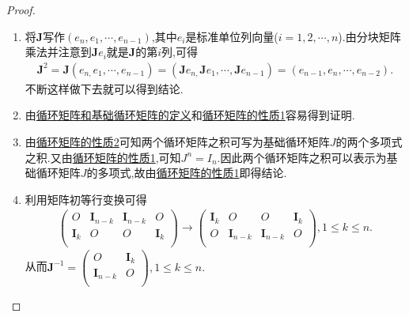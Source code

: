 \documentclass[../../main.tex]{subfiles}
\begin{document}
\begin{proof}
\begin{enumerate}
\item 将$\boldsymbol{J}$写作$(e_n,e_1,\cdots,e_{n-1})$,其中$e_i$是标准单位列向量($i=1,2,\cdots,n$).由分块矩阵乘法并注意到$\boldsymbol{J}e_i$就是$\boldsymbol{J}$的第$i$列,可得
\begin{align*}
\boldsymbol{J}^2=\boldsymbol{J}\left( e_{n,}e_1,\cdots ,e_{n-1} \right) =\left( \boldsymbol{J}e_{n,}\boldsymbol{J}e_1,\cdots ,\boldsymbol{J}e_{n-1} \right) =\left( e_{n-1},e_n,\cdots ,e_{n-2} \right) .
\end{align*}
不断这样做下去就可以得到结论.
\item 由\hyperref[definition:循环矩阵]{循环矩阵和基础循环矩阵的定义}和\hyperref[proposition:循环矩阵的性质]{循环矩阵的性质1}容易得到证明.
\item 由\hyperref[proposition:循环矩阵的性质]{循环矩阵的性质2}可知两个循环矩阵之积可写为基础循环矩阵$J$的两个多项式之积.又由\hyperref[proposition:循环矩阵的性质]{循环矩阵的性质1},可知$J^n=I_n$.因此两个循环矩阵之积可以表示为基础循环矩阵$J$的多项式,故由\hyperref[proposition:循环矩阵的性质]{循环矩阵的性质1}即得结论.
\item 利用矩阵初等行变换可得
\begin{align*}
\left( \begin{matrix}
O&		\boldsymbol{I}_{n-k}&		\boldsymbol{I}_{n-k}&		O\\
\boldsymbol{I}_k&		O&		O&		\boldsymbol{I}_k\\
\end{matrix} \right) \rightarrow \left( \begin{matrix}
\boldsymbol{I}_k&		O&		O&		\boldsymbol{I}_k\\
O&		\boldsymbol{I}_{n-k}&		\boldsymbol{I}_{n-k}&		O\\
\end{matrix} \right) ,1\le k\le n.
\end{align*}
从而$\boldsymbol{J}^{-1}=\left( \begin{matrix}
O&		\boldsymbol{I}_k\\
\boldsymbol{I}_{n-k}&		O\\
\end{matrix} \right) ,1\le k\le n.$
\end{enumerate}
\end{proof}
\end{document}
